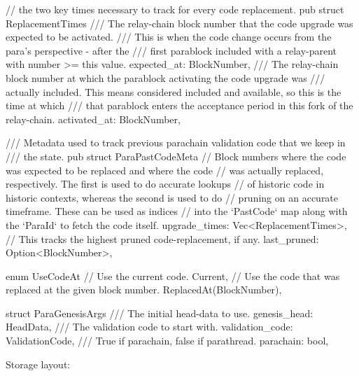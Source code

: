 \begin{verbnobox}[\small]
// the two key times necessary to track for every code replacement.
pub struct ReplacementTimes {
	/// The relay-chain block number that the code upgrade was expected to be activated.
	/// This is when the code change occurs from the para's perspective - after the
	/// first parablock included with a relay-parent with number >= this value.
	expected_at: BlockNumber,
	/// The relay-chain block number at which the parablock activating the code upgrade was
	/// actually included. This means considered included and available, so this is the time at which
	/// that parablock enters the acceptance period in this fork of the relay-chain.
	activated_at: BlockNumber,
}

/// Metadata used to track previous parachain validation code that we keep in
/// the state.
pub struct ParaPastCodeMeta {
	// Block numbers where the code was expected to be replaced and where the code
	// was actually replaced, respectively. The first is used to do accurate lookups
	// of historic code in historic contexts, whereas the second is used to do
	// pruning on an accurate timeframe. These can be used as indices
	// into the `PastCode` map along with the `ParaId` to fetch the code itself.
	upgrade_times: Vec<ReplacementTimes>,
	// This tracks the highest pruned code-replacement, if any.
	last_pruned: Option<BlockNumber>,
}

enum UseCodeAt {
	// Use the current code.
	Current,
	// Use the code that was replaced at the given block number.
	ReplacedAt(BlockNumber),
}

struct ParaGenesisArgs {
  /// The initial head-data to use.
  genesis_head: HeadData,
  /// The validation code to start with.
  validation_code: ValidationCode,
  /// True if parachain, false if parathread.
  parachain: bool,
}
\end{verbnobox}

Storage layout:

